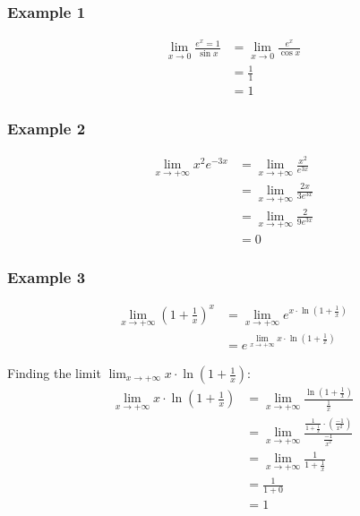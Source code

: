 \documentclass[11pt]{article}
\begin{document}
\subsubsection{Example 1}
\label{sec:org33bbc9f}
\begin{align*}
\lim_{x \rightarrow 0} \frac{e^x = 1}{\sin x} &= \lim_{x \rightarrow 0} \frac{e^x}{\cos x} \\
&= \frac{1}{1} \\
&= 1
\end{align*}

\subsubsection{Example 2}
\label{sec:org2e83b35}
\begin{align*}
\lim_{x \rightarrow +\infty} x^2 e^{-3x} &= \lim_{x \rightarrow +\infty} \frac{x^2}{e^{3x}} \\
&= \lim_{x \rightarrow +\infty} \frac{2x}{3e^{3x}} \\
&= \lim_{x \rightarrow +\infty} \frac{2}{9e^{3x}} \\
&= 0
\end{align*}

\subsubsection{Example 3}
\label{sec:org63a37bb}
\begin{align*}
\lim_{x \rightarrow +\infty} \left(1 + \frac{1}{x} \right)^{x} &= \lim_{x \rightarrow +\infty} e^{x \cdot \ln \left( 1 + \frac{1}{x} \right)} \\
&= e^{\lim_{x \rightarrow +\infty} x \cdot \ln \left(1 + \frac{1}{x} \right)}
\end{align*}

Finding the limit \(\lim_{x \rightarrow +\infty} x \cdot \ln \left(1 + \frac{1}{x} \right)\):
\begin{align*}
\lim_{x \rightarrow +\infty} x \cdot \ln \left(1 + \frac{1}{x} \right) &= \lim_{x \rightarrow +\infty} \frac{\ln \left(1 + \frac{1}{x} \right)}{\frac{1}{x}} \\
&= \lim_{x \rightarrow +\infty} \frac{\frac{1}{1 + \frac{1}{x}} \cdot \left( \frac{-1}{x^2} \right)}{\frac{-1}{x^2}} \\
&= \lim_{x \rightarrow +\infty} \frac{1}{1 + \frac{1}{x}} \\
&= \frac{1}{1 + 0} \\
&= 1
\end{align*}
\end{document}
